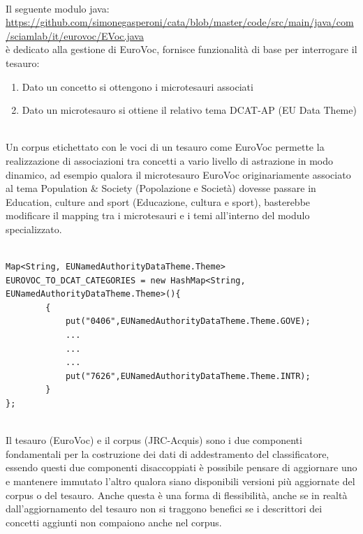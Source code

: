 \documentclass{article}
\theoremstyle{plain}
\theoremstyle{definition}
\begin{document}
\\
Il seguente modulo java:
\url{https://github.com/simonegasperoni/cata/blob/master/code/src/main/java/com/sciamlab/it/eurovoc/EVoc.java}
\\
è dedicato alla gestione di EuroVoc, fornisce funzionalità di base per interrogare il tesauro:
\begin{enumerate}
\item Dato un concetto si ottengono i microtesauri associati
\item Dato un microtesauro si ottiene il relativo tema DCAT-AP (EU Data Theme) 
\end{enumerate}
\phantom
\\
Un corpus etichettato con le voci di un tesauro come EuroVoc permette la realizzazione di associazioni tra concetti a vario livello di astrazione in modo dinamico, ad esempio qualora il microtesauro EuroVoc  originariamente associato al tema Population \& Society (Popolazione e Società) dovesse passare in Education, culture and sport (Educazione, cultura e sport), basterebbe modificare il mapping tra i microtesauri e i temi all'interno del modulo specializzato.
\\
\\
\begin{lstlisting}
Map<String, EUNamedAuthorityDataTheme.Theme> EUROVOC_TO_DCAT_CATEGORIES = new HashMap<String, EUNamedAuthorityDataTheme.Theme>(){
		{
			put("0406",EUNamedAuthorityDataTheme.Theme.GOVE); 		
			...
			...
			...
			put("7626",EUNamedAuthorityDataTheme.Theme.INTR); 	
		}
};
\end{lstlisting}
\phantom
\\
Il tesauro (EuroVoc) e il corpus (JRC-Acquis) sono i due componenti fondamentali per la costruzione dei dati di addestramento del classificatore, essendo questi due componenti disaccoppiati è possibile pensare di aggiornare uno e mantenere immutato l'altro qualora siano disponibili versioni più aggiornate del corpus o del tesauro. Anche questa è una forma di flessibilità, anche se in realtà dall'aggiornamento del tesauro non si traggono benefici se i descrittori dei concetti aggiunti non compaiono anche nel corpus. 
\newpage
\end{document}
